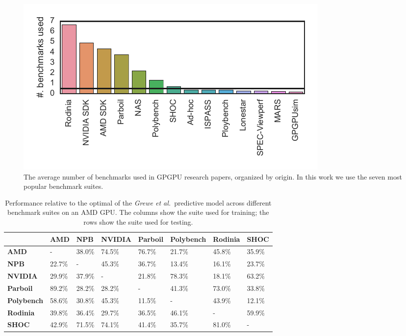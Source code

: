
\begin{figure}[t]
  \includegraphics[width=\columnwidth]{img/motivation-c} %
  \caption{%
    The average number of benchmarks used in GPGPU research papers, organized by
    origin. In this work we use the seven most popular benchmark suites.%
  }%
  \label{fig:benchmark-suite-distribution}
\end{figure}

\begin{table}
  \centering%
  \begin{tabular}{ R{1.5cm} C{1.5cm} C{1.5cm} C{1.5cm} C{1.5cm} C{1.5cm} C{1.5cm} C{1.5cm} }
    \toprule
    & \textbf{AMD} & \textbf{NPB} & \textbf{NVIDIA} & \textbf{Parboil} & \textbf{Polybench} & \textbf{Rodinia} & \textbf{SHOC}\\
    \midrule
    \textbf{AMD} & - & 38.0\% & 74.5\% & 76.7\% & 21.7\% & 45.8\% & 35.9\%\\
    \textbf{NPB} & 22.7\% & - & 45.3\% & 36.7\% & 13.4\% & 16.1\% & 23.7\%\\
    \textbf{NVIDIA} & 29.9\% & 37.9\% & - & 21.8\% & 78.3\% & 18.1\% & 63.2\%\\
    \textbf{Parboil} & 89.2\% & 28.2\% & 28.2\% & - & 41.3\% & 73.0\% & 33.8\%\\
    \textbf{Polybench} & 58.6\% & 30.8\% & 45.3\% & 11.5\% & - & 43.9\% & 12.1\%\\
  \textbf{Rodinia} & 39.8\% & 36.4\% & 29.7\% & 36.5\% & 46.1\% & - & 59.9\%\\
  \textbf{SHOC} & 42.9\% & 71.5\% & 74.1\% & 41.4\% & 35.7\% & 81.0\% & -\\
  \end{tabular}
  \caption{Performance relative to the optimal of the \emph{Grewe et al.\ }predictive model across different benchmark suites on an AMD GPU. The columns show the suite used for training; the rows show the suite used for testing.}%
  \label{tab:cpu-gpu-benchmarks-crossvalidate}
\end{table}

